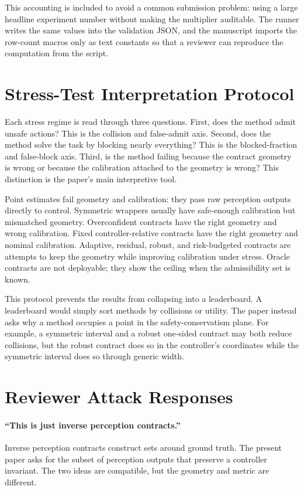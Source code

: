 \documentclass{article}
\begin{document}
This accounting is included to avoid a common submission problem: using a large headline experiment number without making the multiplier auditable. The runner writes the same values into the validation JSON, and the manuscript imports the row-count macros only as text constants so that a reviewer can reproduce the computation from the script.

\section{Stress-Test Interpretation Protocol}

Each stress regime is read through three questions. First, does the method admit unsafe actions? This is the collision and false-admit axis. Second, does the method solve the task by blocking nearly everything? This is the blocked-fraction and false-block axis. Third, is the method failing because the contract geometry is wrong or because the calibration attached to the geometry is wrong? This distinction is the paper's main interpretive tool.

Point estimates fail geometry and calibration: they pass raw perception outputs directly to control. Symmetric wrappers usually have safe-enough calibration but mismatched geometry. Overconfident contracts have the right geometry and wrong calibration. Fixed controller-relative contracts have the right geometry and nominal calibration. Adaptive, residual, robust, and risk-budgeted contracts are attempts to keep the geometry while improving calibration under stress. Oracle contracts are not deployable; they show the ceiling when the admissibility set is known.

This protocol prevents the results from collapsing into a leaderboard. A leaderboard would simply sort methods by collisions or utility. The paper instead asks why a method occupies a point in the safety-conservatism plane. For example, a symmetric interval and a robust one-sided contract may both reduce collisions, but the robust contract does so in the controller's coordinates while the symmetric interval does so through generic width.

\section{Reviewer Attack Responses}

\paragraph{``This is just inverse perception contracts.''}
Inverse perception contracts construct sets around ground truth. The present paper asks for the subset of perception outputs that preserve a controller invariant. The two ideas are compatible, but the geometry and metric are different.
\end{document}

